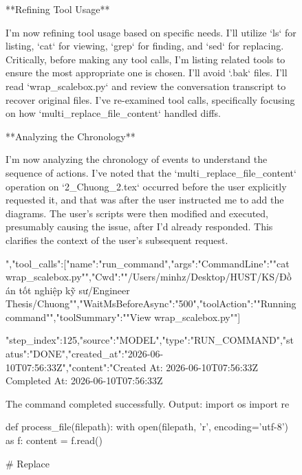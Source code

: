 \begin{figure}[htbp]
{**Refining Tool Usage**

I'm now refining tool usage based on specific needs. I'll utilize `ls` for listing, `cat` for viewing, `grep` for finding, and `sed` for replacing. Critically, before making any tool calls, I'm listing related tools to ensure the most appropriate one is chosen. I'll avoid `.bak` files. I'll read `wrap_scalebox.py` and review the conversation transcript to recover original files. I've re-examined tool calls, specifically focusing on how `multi_replace_file_content` handled diffs.


**Analyzing the Chronology**

I'm now analyzing the chronology of events to understand the sequence of actions. I've noted that the `multi_replace_file_content` operation on `2_Chuong_2.tex` occurred before the user explicitly requested it, and that was after the user instructed me to add the diagrams. The user's scripts were then modified and executed, presumably causing the issue, after I'd already responded. This clarifies the context of the user's subsequent request.


","tool_calls":[{"name":"run_command","args":{"CommandLine":""cat wrap_scalebox.py"","Cwd":""/Users/minhz/Desktop/HUST/KS/Đồ án tốt nghiệp kỹ sư/Engineer Thesis/Chuong"","WaitMsBeforeAsync":"500","toolAction":""Running command"","toolSummary":""View wrap_scalebox.py""}}]}
{"step_index":125,"source":"MODEL","type":"RUN_COMMAND","status":"DONE","created_at":"2026-06-10T07:56:33Z","content":"Created At: 2026-06-10T07:56:33Z
Completed At: 2026-06-10T07:56:33Z

				The command completed successfully.
				Output:
				import os
import re

def process_file(filepath):
    with open(filepath, 'r', encoding='utf-8') as f:
        content = f.read()
        
    # Replace }
\end{figure}
